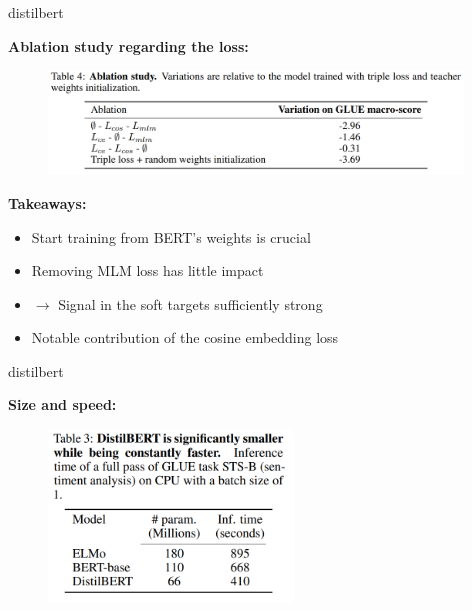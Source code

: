\begin{frame}{distilbert}

\vfill

	\textbf{Ablation study regarding the loss:}

	\begin{figure}
		\centering
		\includegraphics[width = 11cm]{figure/distilbert-ablation.png}\\ 
	\end{figure}

\textbf{Takeaways:}

\begin{itemize}
	\item Start training from BERT's weights is crucial
	\item Removing MLM loss has little impact\\
	\item[] $\to$ Signal in the soft targets sufficiently strong
	\item Notable contribution of the cosine embedding loss
\end{itemize}

\vfill
	
\end{frame}


\begin{frame}{distilbert}

\vfill

\textbf{Size and speed:}

	\begin{figure}
		\centering
		\includegraphics[width = 6.5cm]{figure/distilbert-size-speed.png}\\ 
	\end{figure}

\vfill
	
\end{frame}

